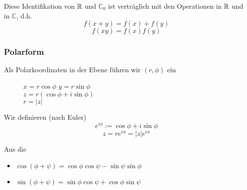 Diese Identifikation von $\mathbb{R}$ und $\mathbb{C}_0$ ist verträglich mit den Operationen in $\mathbb{R}$ und in $\mathbb{C}$, d.h.
\[f(x+y)=f(x)+f(y)\]
\[f(xy)=f(x)f(y)\]
\subsubsection*{Polarform}
Als Polarkoordinaten in der Ebene führen wir $(r,\phi)$ ein

\begin{figure}[ht]
\begin{minipage}[b]{0.45\linewidth}
\begin{center}
\end{center}

\end{minipage}
\hspace{0.5cm}
\begin{minipage}[b]{0.45\linewidth}
$x=r\cos\phi$\hspace{5mm} $y=r\sin\phi$\\
$z=r\left( \cos\phi + i\sin\phi\right)$\\
$r=\left| z\right|$
\vspace{9mm}
\end{minipage}
\end{figure}

\begin{definition}{}
Wir definieren (nach Euler)\[e^{i\phi}:=\cos\phi+ i\sin\phi\]\[z=re^{i\phi}=\left| z\right|e^{i\phi}\]
\end{definition}

\noindent Aus die 
\begin{itemize}
\item $\cos(\phi+\psi)=\cos\phi\cos\psi -\sin\psi\sin\phi$
\item $\sin(\phi+\psi)=\sin\phi\cos\psi + \cos\phi\sin\psi$
\end{itemize}

